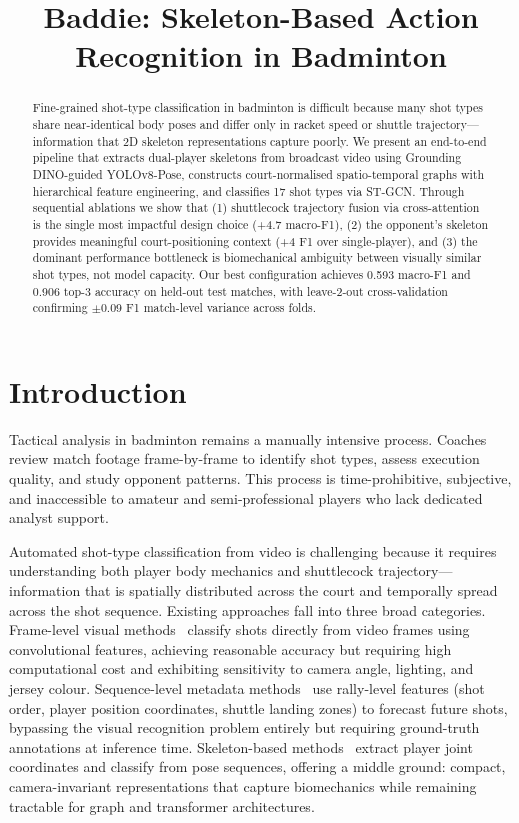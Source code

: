 \documentclass[11pt,a4paper]{article}
\title{\textbf{Baddie: Skeleton-Based Action Recognition in Badminton}}
\author{}
\date{}
\begin{document}
\maketitle

\begin{abstract}
Fine-grained shot-type classification in badminton is difficult because many shot types share near-identical body poses and differ only in racket speed or shuttle trajectory---information that 2D skeleton representations capture poorly. We present an end-to-end pipeline that extracts dual-player skeletons from broadcast video using Grounding DINO-guided YOLOv8-Pose, constructs court-normalised spatio-temporal graphs with hierarchical feature engineering, and classifies 17 shot types via ST-GCN. Through sequential ablations we show that (1) shuttlecock trajectory fusion via cross-attention is the single most impactful design choice (+4.7 macro-F1), (2) the opponent's skeleton provides meaningful court-positioning context (+4 F1 over single-player), and (3) the dominant performance bottleneck is biomechanical ambiguity between visually similar shot types, not model capacity. Our best configuration achieves 0.593 macro-F1 and 0.906 top-3 accuracy on held-out test matches, with leave-2-out cross-validation confirming $\pm$0.09 F1 match-level variance across folds.
\end{abstract}

\section{Introduction}

Tactical analysis in badminton remains a manually intensive process. Coaches review match footage frame-by-frame to identify shot types, assess execution quality, and study opponent patterns. This process is time-prohibitive, subjective, and inaccessible to amateur and semi-professional players who lack dedicated analyst support.

Automated shot-type classification from video is challenging because it requires understanding both player body mechanics and shuttlecock trajectory---information that is spatially distributed across the court and temporally spread across the shot sequence. Existing approaches fall into three broad categories. Frame-level visual methods~\cite{shuttlenet} classify shots directly from video frames using convolutional features, achieving reasonable accuracy but requiring high computational cost and exhibiting sensitivity to camera angle, lighting, and jersey colour. Sequence-level metadata methods~\cite{shuttleset} use rally-level features (shot order, player position coordinates, shuttle landing zones) to forecast future shots, bypassing the visual recognition problem entirely but requiring ground-truth annotations at inference time. Skeleton-based methods~\cite{tempose, bst} extract player joint coordinates and classify from pose sequences, offering a middle ground: compact, camera-invariant representations that capture biomechanics while remaining tractable for graph and transformer architectures.
\end{document}
